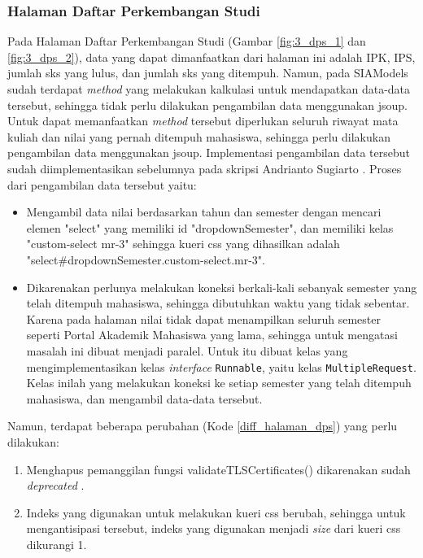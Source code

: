 \subsubsection{Halaman Daftar Perkembangan Studi}
Pada Halaman Daftar Perkembangan Studi (Gambar \ref{fig:3_dps_1} dan \ref{fig:3_dps_2}), data yang dapat dimanfaatkan dari halaman ini adalah IPK, IPS, jumlah sks yang lulus, dan jumlah sks yang ditempuh. Namun, pada SIAModels sudah terdapat \textit{method} yang melakukan kalkulasi untuk mendapatkan data-data tersebut, sehingga tidak perlu dilakukan pengambilan data menggunakan jsoup. Untuk dapat memanfaatkan \textit{method} tersebut diperlukan seluruh riwayat mata kuliah dan nilai yang pernah ditempuh mahasiswa, sehingga perlu dilakukan pengambilan data menggunakan jsoup.  Implementasi pengambilan data tersebut sudah diimplementasikan sebelumnya pada skripsi Andrianto Sugiarto \cite{ifstupor}. Proses dari pengambilan data tersebut yaitu:
    \begin{itemize}
        \item Mengambil data nilai berdasarkan tahun dan semester dengan mencari elemen "select" yang memiliki id "dropdownSemester", dan memiliki kelas "custom-select mr-3" sehingga kueri css yang dihasilkan adalah "select\#dropdownSemester.custom-select.mr-3".
        \label{multipleRequest}
        \item Dikarenakan perlunya melakukan koneksi berkali-kali sebanyak semester yang telah ditempuh mahasiswa, sehingga dibutuhkan waktu yang tidak sebentar. Karena pada halaman nilai tidak dapat menampilkan seluruh semester seperti Portal Akademik Mahasiswa yang lama, sehingga untuk mengatasi masalah ini dibuat menjadi paralel. Untuk itu dibuat kelas yang mengimplementasikan kelas \textit{interface} \texttt{Runnable}, yaitu kelas \texttt{MultipleRequest}. Kelas inilah yang melakukan koneksi ke setiap semester yang telah ditempuh mahasiswa, dan mengambil data-data tersebut.
    \end{itemize}
    Namun, terdapat beberapa perubahan (Kode \ref{diff_halaman_dps}) yang perlu dilakukan:
    \begin{enumerate}
        \item Menghapus pemanggilan fungsi validateTLSCertificates() dikarenakan sudah \textit{deprecated} \cite{jsoup}.
        \item Indeks yang digunakan untuk melakukan kueri css berubah, sehingga untuk mengantisipasi tersebut, indeks yang digunakan menjadi \textit{size} dari kueri css dikurangi 1.
    \end{enumerate}
        
